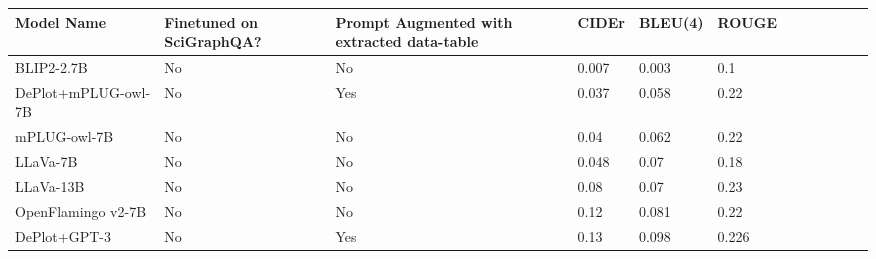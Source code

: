 \documentclass{article}
\begin{document}
\begin{table}[!htbp]\label{mainresultstable}
\renewcommand{\arraystretch}{1.3}
\begin{adjustbox}{max width=\textwidth}
\begin{tabular}{p{4.13cm}p{2.48cm}p{2.48cm}p{2.48cm}p{2.48cm}p{2.48cm}p{4.13cm}p{2.48cm}p{2.48cm}p{2.48cm}p{2.48cm}p{2.48cm}}
\hline
\multicolumn{1}{|p{4.13cm}}{Model Name} & 
\multicolumn{1}{|p{2.48cm}}{Finetuned on SciGraphQA?} & 
\multicolumn{1}{|p{2.48cm}}{Prompt Augmented with extracted data-table} & 
\multicolumn{1}{|p{2.48cm}}{CIDEr} & 
\multicolumn{1}{|p{2.48cm}}{BLEU(4)} & 
\multicolumn{1}{|p{2.48cm}|}{ROUGE} \\ 
\hline
\multicolumn{1}{|p{4.13cm}}{BLIP2-2.7B} & 
\multicolumn{1}{|p{2.48cm}}{No} & 
\multicolumn{1}{|p{2.48cm}}{No} & 
\multicolumn{1}{|p{2.48cm}}{0.007} & 
\multicolumn{1}{|p{2.48cm}}{0.003} & 
\multicolumn{1}{|p{2.48cm}|}{0.1} \\ 
\hline
\multicolumn{1}{|p{4.13cm}}{DePlot+mPLUG-owl-7B} & 
\multicolumn{1}{|p{2.48cm}}{No} & 
\multicolumn{1}{|p{2.48cm}}{Yes} & 
\multicolumn{1}{|p{2.48cm}}{0.037} & 
\multicolumn{1}{|p{2.48cm}}{0.058} & 
\multicolumn{1}{|p{2.48cm}|}{0.22} \\ 
\hline
\multicolumn{1}{|p{4.13cm}}{mPLUG-owl-7B} & 
\multicolumn{1}{|p{2.48cm}}{No} & 
\multicolumn{1}{|p{2.48cm}}{No} & 
\multicolumn{1}{|p{2.48cm}}{0.04} & 
\multicolumn{1}{|p{2.48cm}}{0.062} & 
\multicolumn{1}{|p{2.48cm}|}{0.22} \\ 
\hline
\multicolumn{1}{|p{4.13cm}}{LLaVa-7B} & 
\multicolumn{1}{|p{2.48cm}}{No} & 
\multicolumn{1}{|p{2.48cm}}{No} & 
\multicolumn{1}{|p{2.48cm}}{0.048} & 
\multicolumn{1}{|p{2.48cm}}{0.07} & 
\multicolumn{1}{|p{2.48cm}|}{0.18} \\ 
\hline
\multicolumn{1}{|p{4.13cm}}{LLaVa-13B} & 
\multicolumn{1}{|p{2.48cm}}{No} & 
\multicolumn{1}{|p{2.48cm}}{No} & 
\multicolumn{1}{|p{2.48cm}}{0.08} & 
\multicolumn{1}{|p{2.48cm}}{0.07} & 
\multicolumn{1}{|p{2.48cm}|}{0.23} \\ 
\hline
\multicolumn{1}{|p{4.13cm}}{OpenFlamingo v2-7B} & 
\multicolumn{1}{|p{2.48cm}}{No} & 
\multicolumn{1}{|p{2.48cm}}{No} & 
\multicolumn{1}{|p{2.48cm}}{0.12} & 
\multicolumn{1}{|p{2.48cm}}{0.081} & 
\multicolumn{1}{|p{2.48cm}|}{0.22} \\ 
\hline
\multicolumn{1}{|p{4.13cm}}{DePlot+GPT-3} & 
\multicolumn{1}{|p{2.48cm}}{No} & 
\multicolumn{1}{|p{2.48cm}}{Yes} & 
\multicolumn{1}{|p{2.48cm}}{0.13} & 
\multicolumn{1}{|p{2.48cm}}{0.098} & 
\multicolumn{1}{|p{2.48cm}|}{0.226} \\ 

\end{tabular}
\end{adjustbox}
\end{table}
\end{document}
